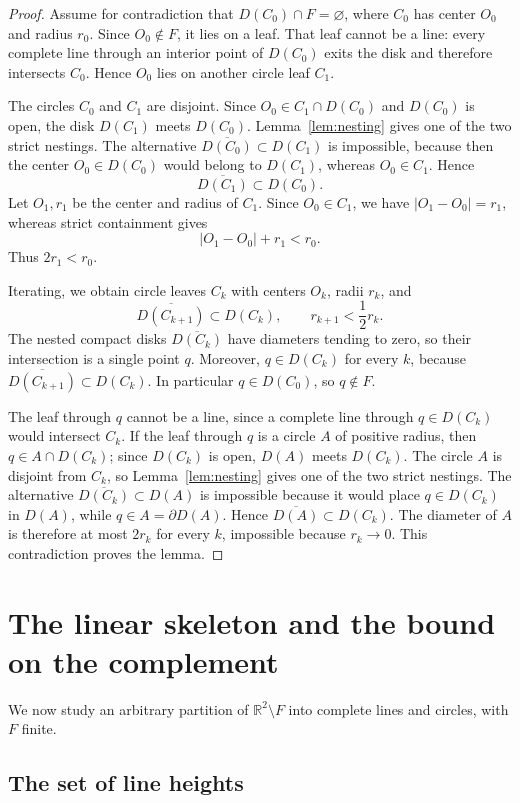 \documentclass[11pt]{article}
\newcommand{\R}{\mathbb{R}}
\newcommand{\ol}{\overline}
\begin{document}
\begin{proof}
Assume for contradiction that $D(C_0)\cap F=\varnothing$, where $C_0$ has center $O_0$ and radius $r_0$. Since $O_0\notin F$, it lies on a leaf. That leaf cannot be a line: every complete line through an interior point of $D(C_0)$ exits the disk and therefore intersects $C_0$. Hence $O_0$ lies on another circle leaf $C_1$.

The circles $C_0$ and $C_1$ are disjoint. Since $O_0\in C_1\cap D(C_0)$ and $D(C_0)$ is open, the disk $D(C_1)$ meets $D(C_0)$. Lemma~\ref{lem:nesting} gives one of the two strict nestings. The alternative $\ol{D(C_0)}\subset D(C_1)$ is impossible, because then the center $O_0\in D(C_0)$ would belong to $D(C_1)$, whereas $O_0\in C_1$. Hence
\[
\ol{D(C_1)}\subset D(C_0).
\]
Let $O_1,r_1$ be the center and radius of $C_1$. Since $O_0\in C_1$, we have $|O_1-O_0|=r_1$, whereas strict containment gives
\[
|O_1-O_0|+r_1<r_0.
\]
Thus $2r_1<r_0$.

Iterating, we obtain circle leaves $C_k$ with centers $O_k$, radii $r_k$, and
\[
\ol{D(C_{k+1})}\subset D(C_k),
\qquad
r_{k+1}<\frac12r_k.
\]
The nested compact disks $\ol{D(C_k)}$ have diameters tending to zero, so their intersection is a single point $q$. Moreover, $q\in D(C_k)$ for every $k$, because $\ol{D(C_{k+1})}\subset D(C_k)$. In particular $q\in D(C_0)$, so $q\notin F$.

The leaf through $q$ cannot be a line, since a complete line through $q\in D(C_k)$ would intersect $C_k$. If the leaf through $q$ is a circle $A$ of positive radius, then $q\in A\cap D(C_k)$; since $D(C_k)$ is open, $D(A)$ meets $D(C_k)$. The circle $A$ is disjoint from $C_k$, so Lemma~\ref{lem:nesting} gives one of the two strict nestings. The alternative $\ol{D(C_k)}\subset D(A)$ is impossible because it would place $q\in D(C_k)$ in $D(A)$, while $q\in A=\partial D(A)$. Hence $\ol{D(A)}\subset D(C_k)$. The diameter of $A$ is therefore at most $2r_k$ for every $k$, impossible because $r_k\to0$. This contradiction proves the lemma.
\end{proof}

\section{The linear skeleton and the bound on the complement}

We now study an arbitrary partition of $\R^2\setminus F$ into complete lines and circles, with $F$ finite.

\subsection{The set of line heights}
\end{document}
